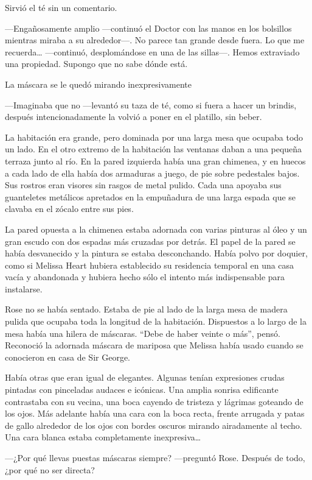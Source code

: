{Sirvió el té sin un comentario.}

{---Engañosamente amplio ---continuó el Doctor con las manos en los
	bolsillos mientras miraba a su alrededor---. No parece tan grande desde
	fuera. Lo que me recuerda\ldots{} ---continuó, desplomándose en una de
	las sillas---. Hemos extraviado una propiedad. Supongo que no sabe dónde
está.}

{La máscara se le quedó mirando inexpresivamente}

{---Imaginaba que no ---levantó su taza de té, como si fuera a hacer un
	brindis, después intencionadamente la volvió a poner en el platillo, sin
beber.}

{La habitación era grande, pero dominada por una larga mesa que ocupaba
	todo un lado. En el otro extremo de la habitación las ventanas daban a
	una pequeña terraza junto al río. En la pared izquierda había una gran
	chimenea, y en huecos a cada lado de ella había dos armaduras a juego,
	de pie sobre pedestales bajos. Sus rostros eran visores sin rasgos de
	metal pulido. Cada una apoyaba sus guanteletes metálicos apretados en la
	empuñadura de una larga espada que se clavaba en el zócalo entre sus
pies.}

{La pared opuesta a la chimenea estaba adornada con varias pinturas al
	óleo y un gran escudo con dos espadas más cruzadas por detrás. El papel
	de la pared se había desvanecido y la pintura se estaba desconchando.
	Había polvo por doquier, como si Melissa Heart hubiera establecido su
	residencia temporal en una casa vacía y abandonada y hubiera hecho sólo
el intento más indispensable para instalarse.}

{Rose no se había sentado. Estaba de pie al lado de la larga mesa de
	madera pulida que ocupaba toda la longitud de la habitación. Dispuestos
	a lo largo de la mesa había una hilera de máscaras. ``Debe de haber
	veinte o más'', pensó. Reconoció la adornada máscara de mariposa que
Melissa había usado cuando se conocieron en casa de Sir George.}

{Había otras que eran igual de elegantes. Algunas tenían expresiones
	crudas pintadas con pinceladas audaces e icónicas. Una amplia sonrisa
	edificante contrastaba con su vecina, una boca cayendo de tristeza y
	lágrimas goteando de los ojos. Más adelante había una cara con la boca
	recta, frente arrugada y patas de gallo alrededor de los ojos con bordes
	oscuros mirando airadamente al techo. Una cara blanca estaba
	completamente inexpresiva\ldots{}}

{---¿Por qué llevas puestas máscaras siempre? ---preguntó Rose. Después
de todo, ¿por qué no ser directa?}

